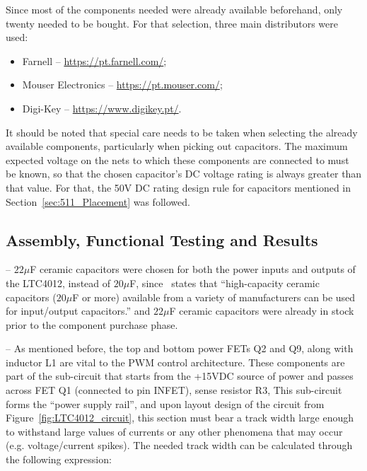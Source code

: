 Since most of the components needed were already available beforehand, only twenty needed to be bought. For that selection, three main distributors were used:
\begin{itemize}
	\item Farnell -- \url{https://pt.farnell.com/};
	\item Mouser Electronics -- \url{https://pt.mouser.com/};
	\item Digi-Key -- \url{https://www.digikey.pt/}.
\end{itemize}

It should be noted that special care needs to be taken when selecting the already available components, particularly when picking out capacitors. The maximum expected voltage on the nets to which these components are connected to must be known, so that the chosen capacitor's DC voltage rating is always greater than that value. For that, the 50V DC rating design rule for capacitors mentioned in Section~\ref{sec:511_Placement} was followed.


\subsection{Assembly, Functional Testing and Results}\label{sec:533_PrototypeAssembly}


-- $22 \mu$F ceramic capacitors were chosen for both the power inputs and outputs of the LTC4012, instead of $20 \mu$F, since~\cite{LTC4012} states that ``high-capacity ceramic capacitors ($20 \mu$F or more) available from a variety of manufacturers can be used for input/output capacitors.'' %
and $22 \mu$F ceramic capacitors were already in stock prior to the component purchase phase.

-- As mentioned before, the top and bottom power FETs Q2 and Q9, along with inductor L1 are vital to the PWM control architecture. These components are part of the sub-circuit that starts from the +15VDC source of power and passes across FET Q1 (connected to pin INFET), sense resistor R3, 
This sub-circuit forms the ``power supply rail'', and upon layout design of the circuit from Figure~\ref{fig:LTC4012_circuit}, this section must bear a track width large enough to withstand large values of currents or any other phenomena that may occur (e.g. voltage/current spikes). The needed track width can be calculated through the following expression:

